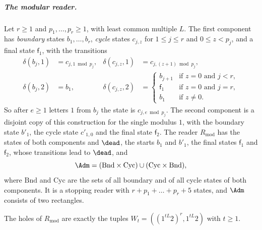 \subparagraph*{The modular reader.}
Let $r\ge1$ and $p_1,\dots,p_r\ge1$, with least common multiple $L$. The
first component has \emph{boundary} states $b_1,\dots,b_r$, \emph{cycle}
states $c_{j,z}$ for $1\le j\le r$ and $0\le z<p_j$, and a final state
$\mathsf f_1$, with the transitions
\[
  \begin{aligned}
  \delta(b_j,1)&=c_{j,1\bmod p_j}, &
  \delta(c_{j,z},1)&=c_{j,(z+1)\bmod p_j},\\
  \delta(b_j,2)&=b_1, &
  \delta(c_{j,z},2)&=
  \begin{cases}
    b_{j+1}&\text{if }z=0\text{ and }j<r,\\
    \mathsf f_1&\text{if }z=0\text{ and }j=r,\\
    b_1&\text{if }z\ne0.
  \end{cases}
  \end{aligned}
\]
So after $e\ge1$ letters $1$ from $b_j$ the state is $c_{j,e\bmod p_j}$. The
second component is a disjoint copy of this construction for the single
modulus $1$, with the boundary state $b'_1$, the cycle state $c'_{1,0}$ and
the final state $\mathsf f_2$. The reader $R_{\mathrm{mod}}$ has the states of both
components and $\dead$, the starts $b_1$ and $b'_1$, the final states $\mathsf f_1$
and $\mathsf f_2$, whose transitions lead to $\dead$, and
\[
  \Adm=(\mathrm{Bnd}\times\mathrm{Cyc})\cup(\mathrm{Cyc}\times\mathrm{Bnd}),
\]
where $\mathrm{Bnd}$ and $\mathrm{Cyc}$ are the sets of all boundary and of
all cycle states of both components. It is a stopping reader with
$r+p_1+\dots+p_r+5$ states, and $\Adm$ consists of two rectangles.

\begin{lemma}\label{lem:modular}
The holes of $R_{\mathrm{mod}}$ are exactly the tuples
$W_t=((1^{tL}2)^r,1^{tL}2)$ with $t\ge1$.
\end{lemma}

